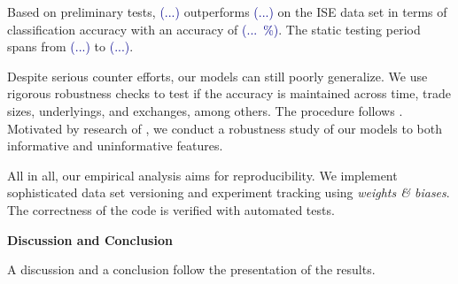 Based on preliminary tests, \textcolor{darkblue}{(...)} outperforms \textcolor{darkblue}{(...)} on the \gls{ISE} data set in terms of classification accuracy with an accuracy of \textcolor{darkblue}{(...~\%)}. The static testing period spans from \textcolor{darkblue}{(...)} to \textcolor{darkblue}{(...)}.


Despite serious counter efforts, our models can still poorly generalize. We use rigorous robustness checks to test if the accuracy is maintained across time, trade sizes, underlyings, and exchanges, among others. The procedure follows \textcites{chakrabartyTradeClassificationAlgorithms2012}{grauerOptionTradeClassification2022}{ronenMachineLearningTrade2022}{savickasInferringDirectionOption2003}. Motivated by research of \textcite{grinsztajnWhyTreebasedModels2022}, we conduct a robustness study of our models to both informative and uninformative features.

All in all, our empirical analysis aims for reproducibility. We implement sophisticated data set versioning and experiment tracking using \textit{weights \& biases}. The correctness of the code is verified with automated tests. 

\textbf{Discussion and Conclusion}

A discussion and a conclusion follow the presentation of the results.


